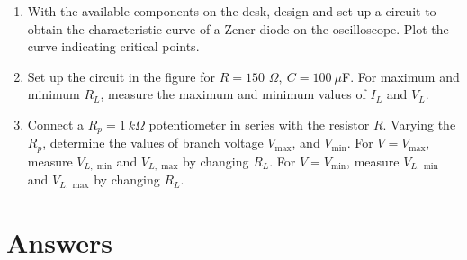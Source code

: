 \documentclass[11pt]{article}
\begin{document}
\begin{enumerate}[leftmargin=*,label=\textbf{\arabic*.}]

\item With the available components on the desk, design and set up a circuit to obtain the characteristic curve of a Zener diode on the oscilloscope. Plot the curve indicating critical points.

\item Set up the circuit in the figure for $R=150$ $\Omega,\: C=100\:\mu$F. For maximum and minimum $R_L$, measure the maximum and minimum values of $I_L$ and $V_L$.

\item Connect a $R_p=1\:k\Omega$ potentiometer in series with the resistor $R$. Varying the $R_p$, determine the values of branch voltage $V_\text{max}$, and $V_\text{min}$. For $V=V_\text{max}$, measure $V_{L,\text{ min}}$ and $V_{L,\text{ max}}$ by changing $R_L$. For $V=V_\text{min}$, measure $V_{L,\text{ min}}$ and $V_{L,\text{ max}}$ by changing $R_L$.

\end{enumerate}

\newpage

\section{Answers}
\end{document}
